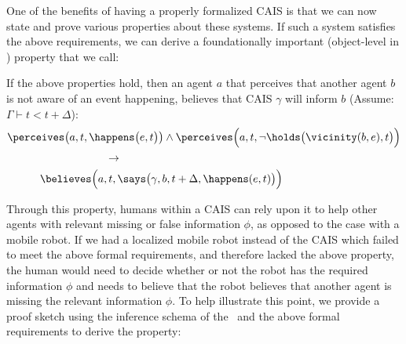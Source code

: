 One of the benefits of having a properly formalized CAIS is that we
can now state and prove various properties about these systems. If such
a system satisfies the above requirements, we can derive a foundationally 
important (object-level in \DCEC) property that we call:

\begin{small}
\begin{mdframed}[linecolor=white, frametitle=Expectation of Usefulness , frametitlebackgroundcolor=gray!25,
  backgroundcolor=gray!10, nobreak=true ,roundcorner=8pt]
  If the above properties hold, then an agent $a$ that perceives that
  another agent $b$ is not aware of an event happening, believes that
  CAIS $\gamma$ will inform $b$ (Assume: $\Gamma \vdash t < t + \Delta$):
\begin{equation*}
\begin{aligned}
&\perceives\big(a, t, \happens\big(e, t\big)\big) \land \perceives\Big(a, t, \lnot \holds\big(\vicinity(b, e),t\big)\Big) \\
& \hspace{90pt} \rightarrow \\
& \hspace{30pt} \believes\Big(a, t, \says\big(\gamma, b, t +\Delta,
\happens(e, t)\big)\Big)\\
\end{aligned}
\end{equation*}
\end{mdframed}
\end{small}

Through this property, humans within a CAIS can rely upon it to help other
agents with relevant missing or false information $\phi$, as opposed to the
case with a mobile robot. If we had a localized mobile robot instead of the
CAIS which failed to meet the above formal requirements, and therefore lacked
the above property, the human would need to decide whether or not the robot has
the required information $\phi$ and needs to believe that the robot believes that
another agent is missing the relevant information $\phi$. To help illustrate this
point, we provide a proof sketch using the inference schema of the \DCEC\ and
the above formal requirements to derive the property:



